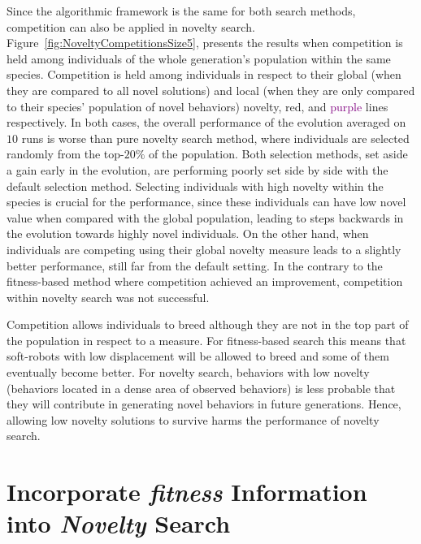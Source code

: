 Since the algorithmic framework is the same for both search methods, competition can also be applied in novelty search. Figure~\ref{fig:NoveltyCompetitionsSize5}, presents the results when competition is held among individuals of the whole generation's population within the same species. Competition is held among individuals in respect to their global (when they are compared to all novel solutions) and local (when they are only compared to their species' population of novel behaviors) novelty, \textcolor{BrickRed}{red}, and \textcolor{Purple}{purple} lines respectively. In both cases, the overall performance of the evolution averaged on $10$ runs is worse than pure novelty search method, where individuals are selected randomly from the top-$20\%$ of the population. Both selection methods, set aside a gain early in the evolution, are performing poorly set side by side with the default selection method. Selecting individuals with high novelty within the species is crucial for the performance, since these individuals can have low novel value when compared with the global population, leading to steps backwards in the evolution towards highly novel individuals. On the other hand, when individuals are competing using their global novelty measure leads to a slightly better performance, still far from the default setting. In the contrary to the fitness-based method where competition achieved an improvement, competition within novelty search was not successful. 

Competition allows individuals to breed although they are not in the top part of the population in respect to a measure. For fitness-based search this means that soft-robots with low displacement will be allowed to breed and some of them eventually become better. For novelty search, behaviors with low novelty (behaviors located in a dense area of observed behaviors) is less probable that they will contribute in generating novel behaviors in future generations. Hence, allowing low novelty solutions to survive harms the performance of novelty search.


\section{Incorporate \emph{fitness} Information into \emph{Novelty} Search}

